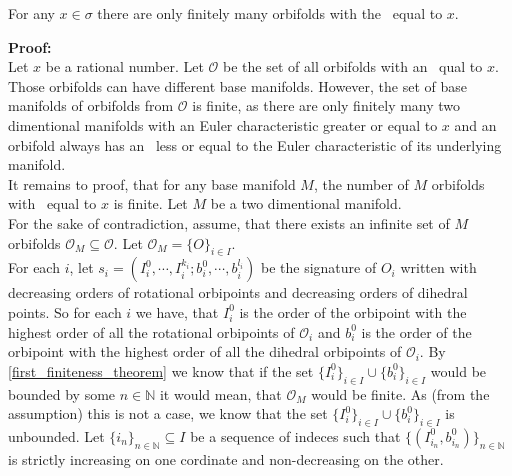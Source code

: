 \begin{theorem}\label{second_finiteness_theorem}
For any $x \in \sigma$ there are only finitely many orbifolds 
with the \Eoc\ equal to $x$.
\end{theorem}
\textbf{Proof:} \\
Let $x$ be a rational number. 
Let $\mathcal{O}$ be the set of all orbifolds with 
an \Eoc\ qual to $x$. 
Those orbifolds can have different base manifolds. However, the set of base manifolds of 
orbifolds from $\mathcal{O}$ is finite, as there are only finitely many 
two dimentional manifolds with an Euler characteristic greater or equal to $x$ and an 
orbifold always has 
an \Eoc\ less or equal to the Euler characteristic of its underlying manifold. \\
It remains to proof, that for any base manifold $M$, the number of $M$ orbifolds 
with \Eoc\ equal to $x$ is finite.
Let $M$ be a two dimentional manifold. \\
For the sake of contradiction, assume, that there exists an infinite set 
of $M$ orbifolds $\mathcal{O}_M \subseteq \mathcal{O}$. 
Let $\mathcal{O}_M = \{O\}_{i \in I}$. \\  
For each $i$, let $s_i = (I^0_i, \cdots, I^{k_i}_i; b^0_i, \cdots, b^{l_i}_i)$ be the signature 
of $O_i$ written with decreasing orders of rotational orbipoints and decreasing orders of 
dihedral points. So for each $i$ we have, that $I^0_i$ is 
the order of the orbipoint with the highest order of all the rotational orbipoints of 
$\mathcal{O}_i$ and $b^0_i$ is 
the order of the orbipoint with the highest order of all the dihedral orbipoints of 
$\mathcal{O}_i$. 
By \ref{first_finiteness_theorem} we know that if the set $\{I^0_i\}_{i \in I} \cup 
\{b^0_i\}_{i \in I}$ 
would be bounded 
by some $n \in \mathbb{N}$ it would mean, that $\mathcal{O}_M$ would be finite. As 
(from the assumption) this is not a case, we know
that the set $\{I^0_i\}_{i \in I} \cup \{b^0_i\}_{i \in I}$ is unbounded. 
Let $\{i_n\}_{n\in \mathbb{N}} \subseteq I$ be a sequence of indeces such that
$\{(I^0_{i_n}, b^0_{i_n})\}_{n\in \mathbb{N}}$ is strictly increasing on one cordinate 
and non-decreasing on the other. \\

